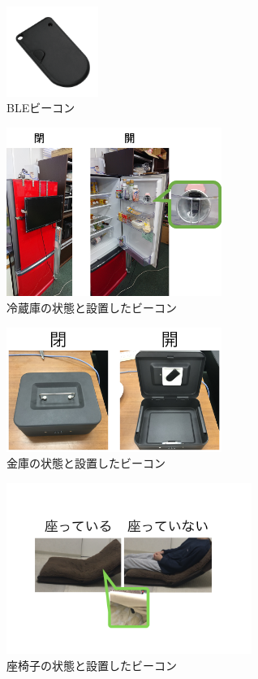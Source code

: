 \documentclass[Japanese]{dicomopapers}
\begin{document}
\begin{figure}[ht]
    \centering
    \includegraphics[width=3cm]{ble.png}
    \caption{BLEビーコン}
    \label{beacon}
   \end{figure}
\begin{figure}[ht]
    \centering
    \includegraphics[width=7cm]{regisW2.png}
    \caption{冷蔵庫の状態と設置したビーコン}
    \label{freezer}
\end{figure}
\begin{figure}[ht]
    \centering
    \includegraphics[width=7cm]{kinkoW.png}
    \caption{金庫の状態と設置したビーコン}
    \label{safe}
\end{figure}
\begin{figure}[ht]
    \centering
    \includegraphics[width=8cm]{zaisuW.png}
    \caption{座椅子の状態と設置したビーコン}
    \label{chair}
\end{figure}
\end{document}
